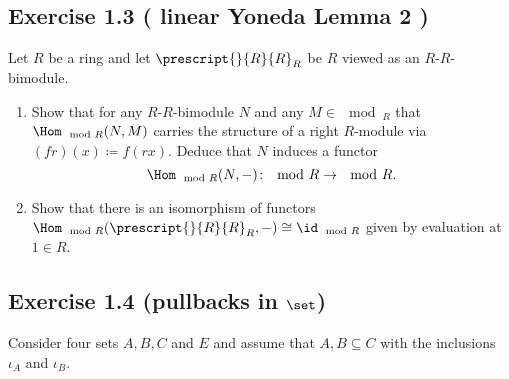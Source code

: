 \subsection{ Exercise 1.3 ( linear Yoneda Lemma 2 )}

Let $ R $ be a ring and let $ \prescript{  }{ R }{ R }_R$ be $ R $ viewed as an $ R $-$ R $-bimodule.

\begin{enumerate}[label=(\alph*)]

    \item 
    Show that for any $ R $-$ R $-bimodule $ N $ and any $ M \in \mod_R $ that $ \Hom_{ \mod R } ( N , M ) $ carries the structure of a right $ R $-module via $ ( f r ) ( x ) \coloneqq f ( r x ) $. 
    Deduce that $ N $ induces a functor
    \[
        \Hom_{\mod R } ( N , - ) \colon \mod R \to \mod R.
    \]
    
    \item 
    
    Show that there is an isomorphism of functors $ \Hom_{ \mod R } ( \prescript{}{ R }{ R }_R , - ) \cong \id_{ \mod R } $ given by evaluation at $ 1 \in R $.
\end{enumerate}

\subsection{ Exercise 1.4 (pullbacks in $\set$) }

Consider four sets $ A , B , C $ and $ E $ and assume that $ A , B \subseteq C $ with the inclusions $ \iota_A $ and $ \iota_B $.

